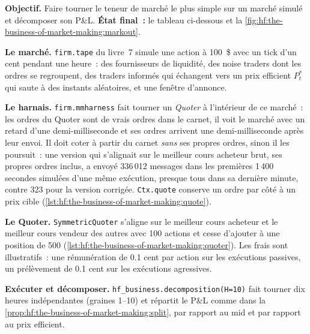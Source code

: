 \begin{tutorial}
\textbf{Objectif.} Faire tourner le teneur de marché le plus simple sur un marché simulé et décomposer son P\&L. \textbf{État final~:} le tableau ci-dessous et la
\cref{fig:hf:the-business-of-market-making:markout}.
\begin{tutsteps}
\item \textbf{Le marché.} \texttt{firm.tape} du livre~7 simule une action à 100~\$ avec un tick d'un cent pendant une heure~: des fournisseurs de liquidité, des noise
traders dont les ordres se regroupent, des traders informés qui échangent vers un prix efficient $P^\ast_t$ qui saute à des instants aléatoires, et une fenêtre d'annonce.
\item \textbf{Le harnais.} \texttt{firm.mmharness} fait tourner un \emph{Quoter} à l'intérieur de ce marché~: les ordres du Quoter sont de vrais ordres dans le carnet, il
voit le marché avec un retard d'une demi-milliseconde et ses ordres arrivent une demi-milliseconde après leur envoi. Il doit coter à partir du carnet \emph{sans}
ses propres ordres, sinon il les poursuit~: une version qui s'alignait sur le meilleur cours acheteur brut, ses propres ordres inclus, a envoyé 336\,012 messages dans les
premières 1\,400 secondes simulées d'une même exécution, presque tous dans sa dernière minute, contre 323 pour la version corrigée. \texttt{Ctx.quote} conserve un ordre par côté à un prix cible
(\cref{lst:hf:the-business-of-market-making:quote}).
\label{lst:hf:the-business-of-market-making:quote}
\item \textbf{Le Quoter.} \texttt{SymmetricQuoter} s'aligne sur le meilleur cours acheteur et le meilleur cours vendeur des autres avec 100 actions et cesse d'ajouter à une position de
500 (\cref{lst:hf:the-business-of-market-making:quoter}). Les frais sont illustratifs~: une rémunération de 0.1 cent par action sur les exécutions passives, un prélèvement de 0.1 cent
sur les exécutions agressives.
\label{lst:hf:the-business-of-market-making:quoter}
\item \textbf{Exécuter et décomposer.} \texttt{hf\_business.decomposition(H=10)} fait tourner dix heures indépendantes (graines 1--10) et répartit le P\&L comme dans la
\cref{prop:hf:the-business-of-market-making:split}, par rapport au mid et par rapport au prix efficient.
\end{tutsteps}
\end{tutorial}

